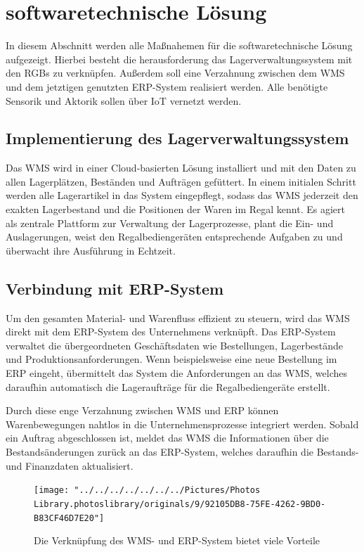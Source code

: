 \section{softwaretechnische Lösung}
In diesem Abschnitt werden alle Maßnahemen für die softwaretechnische Lösung aufgezeigt. Hierbei besteht die herausforderung das Lagerverwaltungssystem mit den RGBs zu verknüpfen. Außerdem soll eine Verzahnung zwischen dem WMS und dem jetztigen genutzten ERP-System realisiert werden. Alle benötigte Sensorik und Aktorik sollen über IoT vernetzt werden.
\subsection{Implementierung des Lagerverwaltungssystem}
Das WMS wird in einer Cloud-basierten Lösung installiert und mit den Daten zu allen Lagerplätzen, Beständen und Aufträgen gefüttert. In einem initialen Schritt werden alle Lagerartikel in das System eingepflegt, sodass das WMS jederzeit den exakten Lagerbestand und die Positionen der Waren im Regal kennt. Es agiert als zentrale Plattform zur Verwaltung der Lagerprozesse, plant die Ein- und Auslagerungen, weist den Regalbediengeräten entsprechende Aufgaben zu und überwacht ihre Ausführung in Echtzeit.

\subsection{Verbindung mit ERP-System}
Um den gesamten Material- und Warenfluss effizient zu steuern, wird das WMS direkt mit dem ERP-System des Unternehmens verknüpft. Das ERP-System verwaltet die übergeordneten Geschäftsdaten wie Bestellungen, Lagerbestände und Produktionsanforderungen. Wenn beispielsweise eine neue Bestellung im ERP eingeht, übermittelt das System die Anforderungen an das WMS, welches daraufhin automatisch die Lageraufträge für die Regalbediengeräte erstellt.

Durch diese enge Verzahnung zwischen WMS und ERP können Warenbewegungen nahtlos in die Unternehmensprozesse integriert werden. Sobald ein Auftrag abgeschlossen ist, meldet das WMS die Informationen über die Bestandsänderungen zurück an das ERP-System, welches daraufhin die Bestands- und Finanzdaten aktualisiert.


\begin{figure}[H]
	\centering
	\texttt{[image: "../../../../../../../Pictures/Photos Library.photoslibrary/originals/9/92105DB8-75FE-4262-9BD0-B83CF46D7E20"]}
	\caption{Die Verknüpfung des WMS- und ERP-System bietet viele Vorteile}
	\label{fig:92105db8-75fe-4262-9bd0-b83cf46d7e20}
\end{figure}

